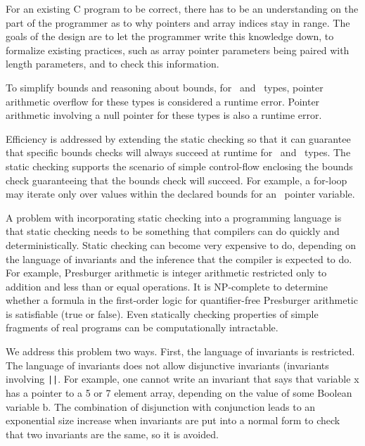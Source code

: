For an existing C program to be correct, there has to be an
understanding on the part of the programmer as to why pointers and array
indices stay in range. The goals of the design are to let the programmer
write this knowledge down, to formalize existing practices, such as
array pointer parameters being paired with length parameters, and to
check this information.

To simplify bounds and reasoning about bounds, for \arrayview\
and \arrayptr\ types, pointer arithmetic overflow for these
types is considered a runtime error. Pointer arithmetic involving a null
pointer for these types is also a runtime error.

Efficiency is addressed by extending the static checking so that it can
guarantee that specific bounds checks will always succeed at runtime for
\arrayptr\ and \arrayview\ types. The static checking
supports the scenario of simple control-flow enclosing the bounds check
guaranteeing that the bounds check will succeed. For example, a for-loop
may iterate only over values within the declared bounds for an
\arrayptr\ pointer variable.

A problem with incorporating static checking into a programming language
is that static checking needs to be something that compilers can do
quickly and deterministically. Static checking can become very expensive
to do, depending on the language of invariants and the inference that
the compiler is expected to do. For example, Presburger arithmetic is
integer arithmetic restricted only to addition and less than or equal
operations. It is NP-complete to determine whether a formula in the
first-order logic for quantifier-free Presburger arithmetic is
satisfiable (true or false). Even statically checking properties of
simple fragments of real programs can be computationally intractable.

We address this problem two ways. First, the language of invariants is
restricted. The language of invariants does not allow disjunctive
invariants (invariants involving \verb+||+. For example, one
cannot write an invariant that says that variable x has a pointer to a 5
or 7 element array, depending on the value of some Boolean variable b.
The combination of disjunction with conjunction leads to an exponential
size increase when invariants are put into a normal form to check that
two invariants are the same, so it is avoided.

